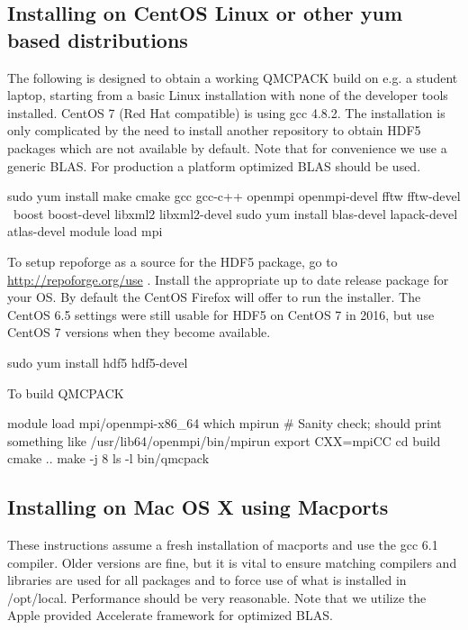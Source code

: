 \subsection{Installing on CentOS Linux or other yum based distributions}

The following is designed to obtain a working QMCPACK build on e.g. a
student laptop, starting from a basic Linux installation with none of
the developer tools installed. CentOS 7 (Red Hat compatible) is using
gcc 4.8.2. The installation is only complicated by the need to install
another repository to obtain HDF5 packages which are not available by
default. Note that for convenience we use a generic BLAS. For
production a platform optimized BLAS should be used.


\begin{shade}
sudo yum install make cmake gcc gcc-c++ openmpi openmpi-devel fftw fftw-devel \
                  boost boost-devel libxml2 libxml2-devel
sudo yum install blas-devel lapack-devel atlas-devel
module load mpi
\end{shade}

To setup repoforge as a source for the HDF5 package, go to
\url{http://repoforge.org/use} . Install the appropriate up to date
release package for your OS. By default the CentOS Firefox will offer
to run the installer. The CentOS 6.5 settings were still usable for HDF5 on
CentOS 7 in 2016, but use CentOS 7 versions when they become
available.


\begin{shade}
sudo yum install hdf5 hdf5-devel
\end{shade}

To build QMCPACK

\begin{shade}
module load mpi/openmpi-x86_64
which mpirun
# Sanity check; should print something like   /usr/lib64/openmpi/bin/mpirun
export CXX=mpiCC
cd build
cmake ..
make -j 8
ls -l bin/qmcpack
\end{shade}

\subsection{Installing on Mac OS X using Macports}
These instructions assume a fresh installation of macports
and use the gcc 6.1 compiler. Older versions are fine, but it is vital to ensure
matching compilers and libraries are used for all
packages and to force use of what is installed in /opt/local.  Performance should be very reasonable.
Note that we utilize the Apple provided Accelerate framework for
optimized BLAS.

